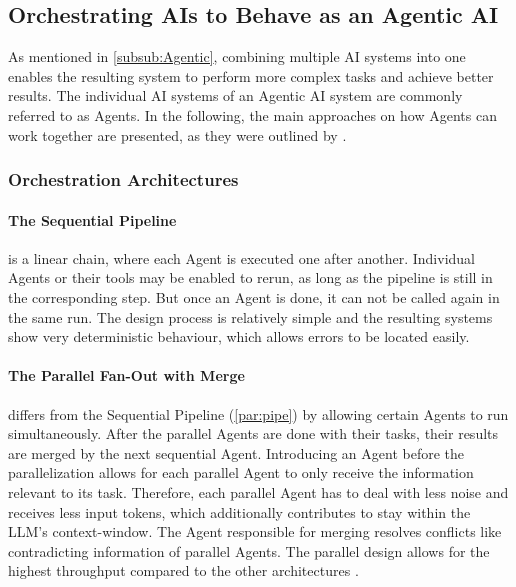 \documentclass[
	fontsize = 11pt,
	paper = a4,
	draft = false,
	twoside = true,
	titlepage = false
]{scrartcl}
\numberwithin{equation}{subsection}
\begin{document}
	\subsection{Orchestrating \gls{AI}s to Behave as an \gls{Agentic AI}}
	As mentioned in \autoref{subsub:Agentic}, combining multiple \gls{AI} systems into one enables the resulting system to perform more complex tasks and achieve better results. The individual \gls{AI} systems of an \gls{Agentic AI} system are commonly referred to as \glspl{Agent}. In the following, the main approaches on how \glspl{Agent} can work together are presented, as they were outlined by \citeauthor{orchStyles} \autocite{orchStyles}.
	
	\subsubsection{Orchestration Architectures}
	\paragraph{The Sequential Pipeline} \autocite[p.~3]{orchStyles}\label{par:pipe} is a linear chain, where each \gls{Agent} is executed one after another. Individual \glspl{Agent} or their tools may be enabled to rerun, as long as the pipeline is still in the corresponding step. But once an \gls{Agent} is done, it can not be called again in the same run. The design process is relatively simple and the resulting systems show very deterministic behaviour, which allows errors to be located easily. \autocite{orchStyles}
	
	\paragraph{The Parallel Fan-Out with Merge} \autocite[p.~4]{orchStyles} \label{par:paral} differs from the Sequential Pipeline (\autoref{par:pipe}) by allowing certain \glspl{Agent} to run simultaneously. After the parallel \glspl{Agent} are done with their tasks, their results are merged by the next sequential \gls{Agent}. Introducing an \gls{Agent} before the parallelization allows for each parallel \gls{Agent} to only receive the information relevant to its task. Therefore, each parallel \gls{Agent} has to deal with less noise and receives less input \glspl{token}, which additionally contributes to stay within the \gls{LLM}'s \gls{context-window}. The \gls{Agent} responsible for merging resolves conflicts like contradicting information of parallel \glspl{Agent}. The parallel design allows for the highest throughput compared to the other architectures \autocite[p.~7]{orchStyles}. \autocite{orchStyles}
	
\end{document}
